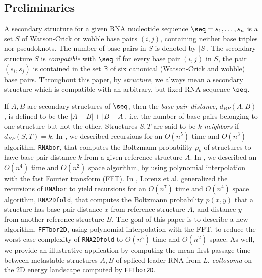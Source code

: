 \subsection{Preliminaries}


A secondary structure for a given RNA nucleotide sequence
$\seq = s_1,\dots,s_n$ is a set $S$ of Watson-Crick or wobble
base pairs $(i,j)$, containing neither base triples nor pseudoknots.
The number of base pairs in $S$ is denoted by $|S|$.
The secondary structure $S$ is {\em compatible}
with $\seq$ if for every base pair $(i,j)$ in $S$, the pair
$(s_i,s_j)$ is contained in the set
$\mathbb{B}$
of six canonical (Watson-Crick and wobble) base pairs.
Throughout this paper, by {\em structure}, we always mean a
secondary structure which is compatible with an arbitrary, but fixed
RNA sequence $\seq$.

If $A,B$ are secondary structures of $\seq$, then the {\em base pair distance},
$d_{BP}(A,B)$, is defined to be the $|A-B|+|B-A|$, i.e. the number of
base pairs belonging to one structure but not the other.
Structures $S,T$ are said to be $k$-{\em neighbors} if $d_{BP}(S,T) = k$.
In \cite{Freyhult.b07}, we described recursions for an $O(n^5)$ time and
$O(n^3)$ algorithm, {\tt RNAbor}, that computes the Boltzmann probability
$p_k$ of structures to have base pair distance $k$ from a given reference
structure $A$. In \cite{fftbor}, we described an $O(n^4)$ time and
$O(n^2)$ space algorithm, by using polynomial interpolation with the
fast Fourier transform (FFT).
In \cite{hofacker:RNAbor2D}, Lorenz et al. generalized
the recursions  of {\tt RNAbor} \cite{Freyhult.b07}
to yield recursions for an $O(n^7)$ time and $O(n^4)$ space
algorithm, {\tt RNA2Dfold},
that computes the Boltzmann probability $p(x,y)$ that a structure has
base pair distance $x$ from reference structure $A$, and distance
$y$ from another reference structure $B$.
The goal of this paper is to describe a new algorithm, {\tt FFTbor2D},
using polynomial interpolation with the FFT, to
reduce the worst case complexity of {\tt RNA2Dfold} to
$O(n^5)$ time and $O(n^2)$ space. As well, we provide an
illustrative application by computing the mean first passage time
between metastable structures $A,B$ of spliced leader RNA from
{\em L. collosoma} on the 2D energy landscape computed by {\tt FFTbor2D}.

